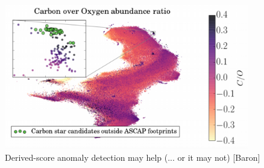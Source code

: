 \documentclass[20pt,landscape,footrule,headrule]{foils}
\begin{document}
\newpage\ 
\begin{center}
\includegraphics[width=0.8\textwidth]{Images/COar.png} \\ 
Derived-score anomaly detection may help (... or it may not) [Baron]
\end{center}
\end{document}
